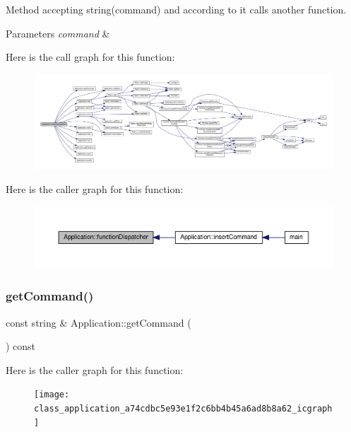 Method accepting string(command) and according to it calls another function. 
\begin{DoxyParams}{Parameters}
{\em command} & \\
\hline
\end{DoxyParams}
Here is the call graph for this function\+:
\nopagebreak
\begin{figure}[H]
\begin{center}
\leavevmode
\includegraphics[width=350pt]{class_application_a00241f0a09c32b0ef3cb1f068475cc50_cgraph}
\end{center}
\end{figure}
Here is the caller graph for this function\+:
\nopagebreak
\begin{figure}[H]
\begin{center}
\leavevmode
\includegraphics[width=350pt]{class_application_a00241f0a09c32b0ef3cb1f068475cc50_icgraph}
\end{center}
\end{figure}
\mbox{\label{class_application_a74cdbc5e93e1f2c6bb4b45a6ad8b8a62}} 
\subsubsection{\texorpdfstring{get\+Command()}{getCommand()}}
{\footnotesize\ttfamily const string \& Application\+::get\+Command (\begin{DoxyParamCaption}{ }\end{DoxyParamCaption}) const}

Here is the caller graph for this function\+:
\nopagebreak
\begin{figure}[H]
\begin{center}
\leavevmode
\texttt{[image: class\_application\_a74cdbc5e93e1f2c6bb4b45a6ad8b8a62\_icgraph]}
\end{center}
\end{figure}
\mbox{\label{class_application_a778575fb76de5352152d8928e1c3410f}} 
